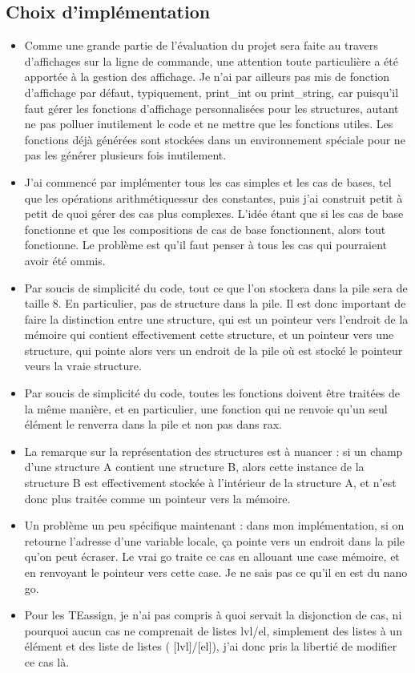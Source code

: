\documentclass{article}
\begin{document}
\subsection{Choix d'implémentation}
\begin{itemize}
\item Comme une grande partie de l'évaluation du projet sera faite au travers d'affichages sur la ligne de commande, une attention toute particulière a été apportée à la gestion des affichage. Je n'ai par ailleurs pas mis de fonction d'affichage par défaut, typiquement, print\_int ou print\_string, car puisqu'il faut gérer les fonctions d'affichage personnalisées pour les structures, autant ne pas polluer inutilement le code et ne mettre que les fonctions utiles. Les fonctions déjà générées sont stockées dans un environnement spéciale pour ne pas les générer plusieurs fois inutilement.
\item J'ai commencé par implémenter tous les cas simples et les cas de bases, tel que les opérations arithmétiquessur des constantes, puis j'ai construit petit à petit de quoi gérer des cas plus complexes. L'idée étant que si les cas de base fonctionne et que les compositions de cas de base fonctionnent, alors tout fonctionne. Le problème est qu'il faut penser à tous les cas qui pourraient avoir été ommis.
\item Par soucis de simplicité du code, tout ce que l'on stockera dans la pile sera de taille 8. En particulier, pas de structure dans la pile. Il est donc important de faire la distinction entre une structure, qui est un pointeur vers l'endroit de la mémoire qui contient effectivement cette structure, et un pointeur vers une structure, qui pointe alors vers un endroit de la pile où est stocké le pointeur veurs la vraie structure.
\item Par soucis de simplicité du code, toutes les fonctions doivent être traitées de la même manière, et en particulier, une fonction qui ne renvoie qu'un seul élément le renverra dans la pile et non pas dans rax.
\item La remarque sur la représentation des structures est à nuancer : si un champ d'une structure A contient une structure B, alors cette instance de la structure B est effectivement stockée à l'intérieur de la structure A, et n'est donc plus traitée comme un pointeur vers la mémoire.
\item Un problème un peu spécifique maintenant : dans mon implémentation, si on retourne l'adresse d'une variable locale, ça pointe vers un endroit dans la pile qu'on peut écraser. Le vrai go traite ce cas en allouant une case mémoire, et en renvoyant le pointeur vers cette case. Je ne sais pas ce qu'il en est du nano go.
\item Pour les TEassign, je n'ai pas compris à quoi servait la disjonction de cas, ni pourquoi aucun cas ne comprenait de listes lvl/el, simplement des listes à un élément et des liste de listes ( [lvl]/[el]), j'ai donc pris la libertié de modifier ce cas là.
\end{itemize}
\end{document}
